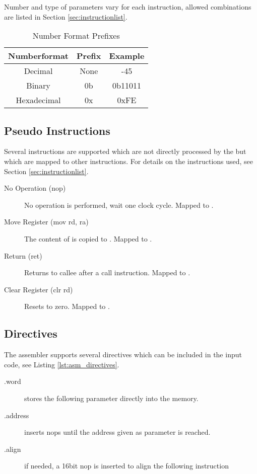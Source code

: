 Number and type of parameters vary for each instruction, allowed combinations are listed in Section \ref{sec:instructionlist}.

\begin{table}
	\begin{center}
	\begin{tabular}{|c|c|c|}
	\hline 
	Numberformat & Prefix & Example\\
	\hline\hline
	Decimal      & None   & -45 \\ 
	Binary       & 0b     & 0b11011 \\ 
	Hexadecimal  & 0x     & 0xFE \\ 
	\hline 
	\end{tabular} 
	\end{center}
	\caption{Number Format Prefixes}
	\label{tbl:asm_numberformats}
\end{table}

\subsection{Pseudo Instructions}
Several instructions are supported which are not directly processed by the \procname but which are mapped to other instructions.
For details on the instructions used, see Section \ref{sec:instructionlist}.
\begin{description}
\item[No Operation (nop)] No operation is performed, wait one clock cycle. Mapped to .
\item[Move Register (mov rd, ra)] The content of  is copied to . Mapped to .
\item[Return (ret)] Returns to callee after a call instruction. Mapped to .
\item[Clear Register (clr rd)] Resets  to zero. Mapped to .
\end{description}

\subsection{Directives}%
\label{sec:AssemblerDirectives}%
The assembler supports several directives which can be included in the input code, see Listing \ref{lst:asm_directives}.
\begin{description}
\item[.word]stores the following parameter directly into the memory.
\item[.address]inserts nops until the address given as parameter is reached.
\item[.align]if needed, a 16bit nop is inserted to align the following instruction
\end{description}

